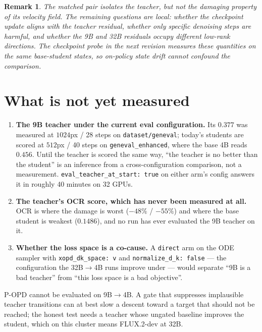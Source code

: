\documentclass[11pt,a4paper]{article}
\newtheorem*{remark*}{Remark}
\begin{document}
\begin{remark*}
The matched pair isolates the teacher, but not the damaging property of its velocity field. The
remaining questions are local: whether the checkpoint update aligns with the teacher residual,
whether only specific denoising steps are harmful, and whether the 9B and 32B residuals occupy
different low-rank directions. The checkpoint probe in the next revision measures these quantities
on the same base-student states, so on-policy state drift cannot confound the comparison.
\end{remark*}

\section{What is not yet measured}
\label{sec:gaps}

\begin{enumerate}[leftmargin=1.6em,itemsep=0.3em]
\item \textbf{The 9B teacher under the current eval configuration.} Its $0.377$ was measured at
      $1024$px / 28 steps on \texttt{dataset/geneval}; today's students are scored at $512$px / 40
      steps on \texttt{geneval\_enhanced}, where the base 4B reads $0.456$. Until the teacher is
      scored the same way, ``the teacher is no better than the student'' is an inference from a
      cross-configuration comparison, not a measurement. \texttt{eval\_teacher\_at\_start: true}
      on either arm's config answers it in roughly 40 minutes on 32 GPUs.
\item \textbf{The teacher's OCR score, which has never been measured at all.} OCR is where the
      damage is worst ($-48\%$ / $-55\%$) and where the base student is weakest ($0.1486$), and no
      run has ever evaluated the 9B teacher on it.
\item \textbf{Whether the loss space is a co-cause.} A \texttt{direct} arm on the ODE sampler with
      \texttt{xopd\_dk\_space: v} and \texttt{normalize\_d\_k: false} --- the configuration the
      32B$\to$4B runs improve under --- would separate ``9B is a bad teacher'' from ``this loss
      space is a bad objective''.
\end{enumerate}

\begin{tcolorbox}[colback=blue!3!white,colframe=blue!40!black,title={Consequence for the P-OPD programme}]
P-OPD cannot be evaluated on 9B$\to$4B. A gate that suppresses implausible teacher transitions can
at best slow a descent toward a target that should not be reached; the honest test needs a teacher
whose ungated baseline improves the student, which on this cluster means FLUX.2-dev at 32B.
\end{tcolorbox}
\end{document}

